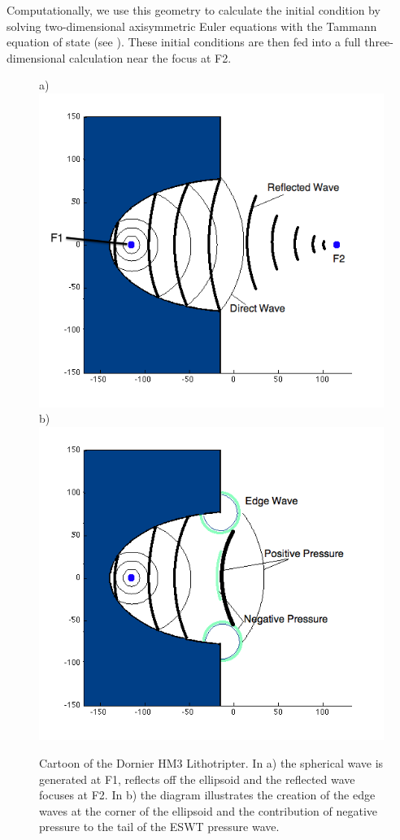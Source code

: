 \documentclass{article}
\begin{document}
Computationally, we
use this geometry to calculate the initial condition by solving
two-dimensional axisymmetric Euler equations with the Tammann equation of
state (see ).   These initial conditions are then fed into a full 
three-dimensional calculation near the focus at F2.

\begin{figure}
\begin{center}
a) \includegraphics[scale=0.35]{lithotripter_schematic.png}\hspace{1mm}
b) \includegraphics[scale=0.35]{lithotripter_edge_wave.png}
\end{center}
\caption{Cartoon of the Dornier HM3 Lithotripter.  In a) the spherical wave is generated at F1, reflects off 
the ellipsoid and the reflected wave focuses at F2.  In b) the diagram illustrates the creation of the edge 
waves at the corner of the ellipsoid and the contribution of negative pressure to the tail of the ESWT 
pressure wave.}
\label{fig:hm3_diagram}
\end{figure}
\end{document}
